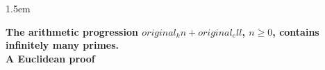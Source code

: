 
\pagestyle{fancy}
\headheight 30pt
\fancyhf{}
\headsep 1.5em

\hypersetup{colorlinks, citecolor=green, linkcolor=blue, urlcolor=blue}

\setlength{\parindent}{20pt}


\newtheorem{theorem}{Theorem}%
\newtheorem{lemma}[theorem]{Lemma}

\theoremstyle{definition}
\newtheorem{definition}[theorem]{Definition}

\renewcommand{\qedsymbol}{\rule{0.7em}{0.7em}} %
\newcommand{\Z}{\ensuremath{\mathbb{Z}}}
\newcommand{\Q}{\ensuremath{\mathbb{Q}}}
\newcommand{\C}{\ensuremath{\mathbb{C}}}
\newcommand{\F}{\ensuremath{\mathbb{F}}}
\DeclareMathOperator{\degpol}{deg} %
\newcommand{\splitatcommas}[1]{%
  \begingroup
  \begingroup\lccode`~=`, \lowercase{\endgroup
    \edef~{\mathchar\the\mathcode`, \penalty0 \noexpand\hspace{0pt plus 1em}}%
  }\mathcode`,="8000 #1%
  \endgroup
}%
\newsavebox{\equationbox} %
\newcommand{\autosizeequation}[1]{%
	\sbox{\equationbox}{$\displaystyle #1$}%
	\ifdim \wd\equationbox > \textwidth %
	\resizebox{\textwidth}{!}{$\displaystyle #1$}%
	\else
	#1 %
	\fi
}%
\renewcommand\title{\textbf{The arithmetic progression ${original_k}n+{original_ell}$, $n\geqslant0$, contains infinitely many primes.\\ A Euclidean proof}}


\thispagestyle{plain}
\sloppy
\begin{center}
{\huge \bfseries \title\par}
\vspace{1cm}
\end{center}

